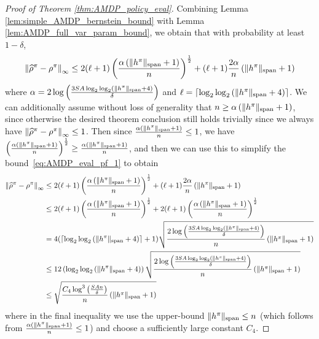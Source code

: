 \documentclass{article}
\theoremstyle{plain}
\theoremstyle{plain}
\theoremstyle{remark}
\theoremstyle{plain}
\theoremstyle{plain}
\newcommand{\rhohat}{\widehat{\rho}}
\begin{document}
\begin{proof}[Proof of Theorem \ref{thm:AMDP_policy_eval}]
    Combining Lemma \ref{lem:simple_AMDP_bernstein_bound} with Lemma \ref{lem:AMDP_full_var_param_bound}, we obtain that with probability at least $1 - \delta$,
    \begin{align}
        \infnorm{\rhohat^\pi - \rho^\pi} \leq 2 (\ell + 1) \left(\frac{\alpha \left(\spannorm{h^\pi} + 1\right)}{n} \right)^{ \frac{1}{2}}+ (\ell+1) \frac{2\alpha   }{n}\left(\spannorm{h^\pi} + 1 \right) \label{eq:AMDP_eval_pf_1}
    \end{align}
    where $\alpha = 2 \log \left( \frac{3 SA   \log_2 \log_2 \left(\Vert h^\pi\Vert _{\textnormal{span}} + 4 \right) }{\delta }\right)$ and $\ell = \lceil\log_2 \log_2 \left( \Vert h^\pi\Vert _{\textnormal{span}} + 4\right) \rceil$.
    We can additionally assume without loss of generality that $n \geq \alpha \left(\Vert h^\pi\Vert _{\textnormal{span}} + 1 \right)$, since otherwise the desired theorem conclusion still holds trivially since we always have $\infnorm{\rhohat^\pi - \rho^\pi} \leq 1$. Then since $\frac{\alpha  \left(\Vert h^\pi\Vert _{\textnormal{span}} + 1 \right) }{n} \leq 1$, we have $\left(\frac{\alpha \left(\Vert h^\pi\Vert _{\textnormal{span}} + 1\right)}{n} \right)^{ \frac{1}{2}} \geq \frac{\alpha \left(\Vert h^\pi\Vert _{\textnormal{span}} + 1\right)}{n}$, and then we can use this to simplify the bound~\eqref{eq:AMDP_eval_pf_1} to obtain
    \begin{align*}
        \infnorm{\rhohat^\pi - \rho^\pi} &\leq 2 (\ell + 1) \left(\frac{\alpha \left(\spannorm{h^\pi} + 1\right)}{n} \right)^{ \frac{1}{2}}+ (\ell+1) \frac{2\alpha   }{n}\left(\spannorm{h^\pi} + 1 \right) \\
        & \leq 2 (\ell + 1) \left(\frac{\alpha \left(\spannorm{h^\pi} + 1\right)}{n} \right)^{ \frac{1}{2}}+ 2(\ell+1) \left(\frac{\alpha \left(\spannorm{h^\pi} + 1\right)}{n} \right)^{ \frac{1}{2}} \\
        &= 4 (\left\lceil\log_2 \log_2 \left( \spannorm{h^\pi} + 4\right) \right\rceil + 1) \sqrt{\frac{2 \log \left( \frac{3 SA   \log_2 \log_2 \left(\spannorm{h^\pi} + 4 \right) }{\delta }\right)}{n}\left(\spannorm{h^\pi} + 1\right)} \\
        & \leq 12 \left(\log_2 \log_2 \left( \spannorm{h^\pi} + 4\right)\right)   \sqrt{\frac{2 \log \left( \frac{3 SA   \log_2 \log_2 \left(\spannorm{h^\pi} + 4 \right) }{\delta }\right)}{n}\left(\spannorm{h^\pi} + 1\right)} \\
        & \leq \sqrt{\frac{C_4 \log^3 \left( \frac{SAn}{\delta} \right)}{n} \left( \spannorm{h^\pi}+1 \right)}
    \end{align*}
    where in the final inequality we use the upper-bound $\Vert h^\pi\Vert _{\textnormal{span}} \leq n$ (which follows from $\frac{\alpha  \left(\Vert h^\pi\Vert _{\textnormal{span}} + 1 \right) }{n} \leq 1$) and choose a sufficiently large constant $C_4$.
\end{proof}
\end{document}
